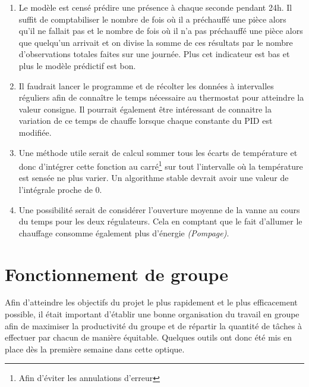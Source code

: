 \documentclass[11pt,a4paper,11pt]{report}
\begin{document}
\begin{enumerate}
\item Le modèle est censé prédire une présence à chaque seconde pendant 24h. Il suffit de comptabiliser le nombre de fois où il a préchauffé une pièce alors qu'il ne fallait pas et le nombre de fois où il n'a pas préchauffé une pièce alors que quelqu'un arrivait et on divise la somme de ces résultats par le nombre d'observations totales faites sur une journée. Plus cet indicateur est bas et plus le modèle prédictif est bon.\\

\item Il faudrait lancer le programme et de récolter les données à intervalles réguliers afin de connaître le temps nécessaire au thermostat pour atteindre la valeur consigne. Il pourrait également être intéressant de connaitre la variation de ce temps de chauffe lorsque chaque constante du PID est modifiée.\\

\item Une méthode utile serait de calcul sommer tous les écarts de température et donc d'intégrer cette fonction au carré\footnote{Afin d'éviter les annulations d'erreur} sur tout l'intervalle où la température est sensée ne plus varier. Un algorithme stable devrait avoir une valeur de l'intégrale proche de 0.\\

\item Une possibilité serait de considérer l'ouverture moyenne de la vanne au cours du temps pour les deux régulateurs. Cela en comptant que le fait d'allumer le chauffage consomme également plus d'énergie \textit{(Pompage)}.\\

\end{enumerate}

\chapter{Fonctionnement de groupe}

	Afin d’atteindre les objectifs du projet le plus rapidement et le plus efficacement possible, il était important d’établir une bonne organisation du travail en groupe afin de maximiser la productivité du groupe et de répartir la quantité de tâches à effectuer par chacun de manière équitable. Quelques outils ont donc été mis en place dès la première semaine dans cette optique.\\
\end{document}
